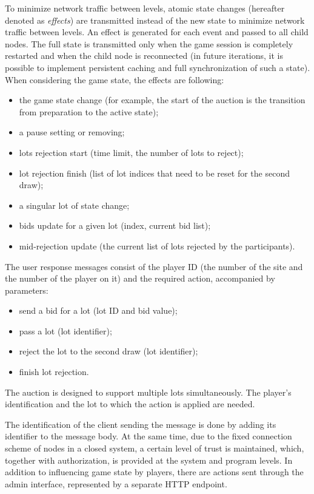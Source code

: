 \documentclass[
]{ceurart}
\begin{document}
To minimize network traffic between levels, atomic state changes (hereafter denoted as \emph{effects}) are transmitted instead of the new state to minimize network traffic between levels. An effect is generated for each event and passed to all child nodes. The full state is transmitted only when the game session is completely restarted and when the child node is reconnected (in future iterations, it is possible to implement persistent caching and full synchronization of such a state).
When considering the game state, the effects are following:
\begin{itemize}
\item the game state change (for example, the start of the auction is the transition from preparation to the active state);
  \item  a pause setting or removing;
  \item  lots rejection start (time limit, the number of lots to reject);
  \item  lot rejection finish (list of lot indices that need to be reset for the second draw);
  \item  a singular lot of state change;
  \item  bids update for a given lot (index, current bid list);
  \item  mid-rejection update (the current list of lots rejected by the participants).
\end{itemize}

The user response messages consist of the player ID (the number of the site and the number of the player on it) and the required action, accompanied by parameters:
\begin{itemize}
\item  send a bid for a lot (lot ID and bid value);
\item  pass a lot (lot identifier);
\item  reject the lot to the second draw (lot identifier);
\item  finish lot rejection.
\end{itemize}
The auction is designed to support multiple lots simultaneously.  The player's identification and the lot to which the action is applied are needed.

The identification of the client sending the message is done by adding its identifier to the message body. At the same time, due to the fixed connection scheme of nodes in a closed system, a certain level of trust is maintained, which, together with authorization, is provided at the system and program levels. In addition to influencing game state by players, there are actions sent through the admin interface, represented by a separate HTTP endpoint.
\end{document}
